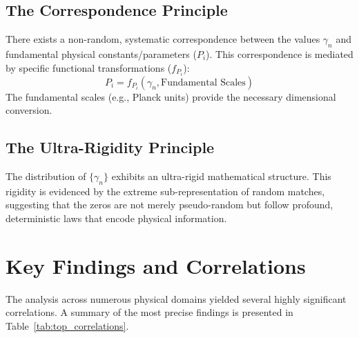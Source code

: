 \documentclass[12pt, twocolumn, reprint, amsmath, amssymb, aps]{revtex4-2}
\newcommand{\riemannzeros}{\{\gamma_n\}}
\begin{document}
\subsection{The Correspondence Principle}
\label{sec:correspondence}
There exists a non-random, systematic correspondence between the values $\gamma_n$ and fundamental physical constants/parameters ($P_i$). This correspondence is mediated by specific functional transformations ($f_{P_i}$):
\begin{equation}
    P_i = f_{P_i}(\gamma_n, \text{Fundamental Scales})
\end{equation}
The fundamental scales (e.g., Planck units) provide the necessary dimensional conversion.

\subsection{The Ultra-Rigidity Principle}
\label{sec:rigidity}
The distribution of $\riemannzeros$ exhibits an ultra-rigid mathematical structure. This rigidity is evidenced by the extreme sub-representation of random matches, suggesting that the zeros are not merely pseudo-random but follow profound, deterministic laws that encode physical information.

\section{Key Findings and Correlations}
\label{sec:findings}
The analysis across numerous physical domains yielded several highly significant correlations. A summary of the most precise findings is presented in Table~\ref{tab:top_correlations}.
\end{document}
